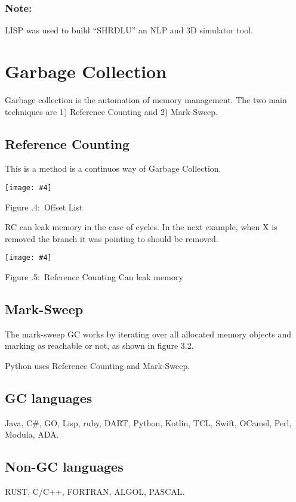 \documentclass[twoside]{article}
\newcounter{lecnum}
\newcommand{\fig}[4]{
            \centerline{\texttt{[image: \#4]}}
            \begin{center}
            Figure \thelecnum.#1:~#3
            \end{center}
    }
\begin{document}
\subsubsection*{Note:}
LISP was used to build ``SHRDLU'' an NLP and 3D simulator tool.

\section{Garbage Collection}
Garbage collection is the automation of memory management. The two main techniques are 1) Reference Counting and 2) Mark-Sweep.


\subsection{Reference Counting}
This is a method is a continuos way of Garbage Collection. 

\fig{4}{0.6}{Offset List}{refcounting.drawio.png}
RC can leak memory in the case of cycles. In the next example, when X is removed the branch it was pointing to should be removed. 

\fig{5}{0.6}{Reference Counting Can leak memory}{rc_leak.drawio.png}

\subsection{Mark-Sweep}
The mark-sweep GC works by iterating over all allocated memory objects and marking as reachable or not, as shown in figure 3.2.

Python uses Reference Counting and Mark-Sweep.
\subsection*{GC languages}
Java, C\#, GO, Lisp, ruby, DART, Python, Kotlin, TCL, Swift, OCamel, Perl, Modula, ADA.
\subsection*{Non-GC languages}
RUST, C/C++, FORTRAN, ALGOL, PASCAL.
\end{document}
